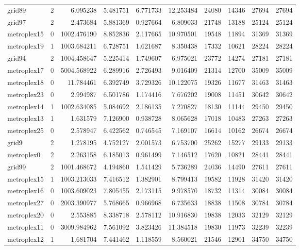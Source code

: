 \begin{longtable}{|l|r|r|r|r|r|r|r|r|r|}
grid89 & 2 & 6.095238 & 5.481751 & 6.771733 & 12.253484 & 24080 & 14346 & 27694 & 27694 \\
grid97 & 2 & 2.473684 & 5.881369 & 0.927664 & 6.809033 & 21748 & 13188 & 25124 & 25124 \\
metroplex15 & 0 & 1002.476190 & 8.852836 & 2.117665 & 10.970501 & 19548 & 11894 & 31369 & 31369 \\
metroplex19 & 1 & 1003.684211 & 6.728751 & 1.621687 & 8.350438 & 17332 & 10621 & 28224 & 28224 \\
grid94 & 2 & 1004.458647 & 5.225414 & 1.749607 & 6.975021 & 23772 & 14274 & 27181 & 27181 \\
metroplex17 & 0 & 5004.568922 & 6.289916 & 2.726493 & 9.016409 & 21314 & 12700 & 35009 & 35009 \\
metroplex18 & 0 & 11.784461 & 6.392749 & 3.729326 & 10.122075 & 19326 & 11677 & 31463 & 31463 \\
metroplex23 & 0 & 2.994987 & 6.501786 & 1.174416 & 7.676202 & 19008 & 11451 & 30642 & 30642 \\
metroplex14 & 1 & 1002.634085 & 5.084692 & 2.186135 & 7.270827 & 18130 & 11144 & 29450 & 29450 \\
metroplex13 & 1 & 1.631579 & 7.126900 & 0.938728 & 8.065628 & 17018 & 10483 & 27263 & 27263 \\
metroplex25 & 0 & 2.578947 & 6.422562 & 0.746545 & 7.169107 & 16614 & 10162 & 26674 & 26674 \\
grid9 & 2 & 1.278195 & 4.752127 & 2.001573 & 6.753700 & 25262 & 15277 & 29133 & 29133 \\
metroplex0 & 2 & 2.263158 & 6.185013 & 0.961499 & 7.146512 & 17620 & 10821 & 28441 & 28441 \\
grid99 & 2 & 1001.468672 & 4.194860 & 1.541429 & 5.736289 & 24036 & 14490 & 27611 & 27611 \\
metroplex15 & 1 & 1003.213033 & 7.416512 & 1.382901 & 8.799413 & 19582 & 11928 & 31420 & 31420 \\
metroplex16 & 0 & 1003.609023 & 7.805455 & 2.173115 & 9.978570 & 18732 & 11314 & 30084 & 30084 \\
metroplex27 & 0 & 2003.390977 & 5.768665 & 0.966968 & 6.735633 & 18838 & 11508 & 30784 & 30784 \\
metroplex20 & 0 & 2.553885 & 8.338718 & 2.578112 & 10.916830 & 19838 & 12033 & 32129 & 32129 \\
metroplex11 & 0 & 3009.984962 & 7.561092 & 3.823426 & 11.384518 & 19830 & 11973 & 32239 & 32239 \\
metroplex12 & 1 & 1.681704 & 7.441462 & 1.118559 & 8.560021 & 21546 & 12901 & 34750 & 34750 \\

\end{longtable}
